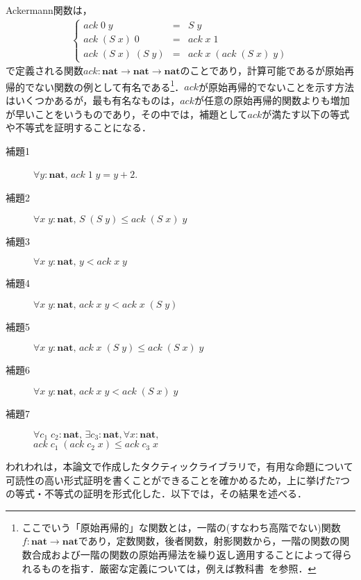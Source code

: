 \documentclass[submit]{ipsj}
\begin{document}
Ackermann関数は，
\begin{eqnarray}
\left\{\begin{array}{lll}
\mathit{ack}\;0\;y &=& S\;y \\
\mathit{ack}\;(S\;x)\;0 &=& \mathit{ack}\;x\;1 \\
\mathit{ack}\;(S\;x)\;(S\;y)&=& \mathit{ack}\;x\;(\mathit{ack}\;(S\;x)\;y)
\end{array}\right.\label{fml:ack}
\end{eqnarray}
で定義される関数$\mathit{ack} : \mathbf{nat} \to \mathbf{nat} \to \mathbf{nat}$のことであり，計算可能であるが原始再帰的でない関数の例として有名である\footnote{ここでいう「原始再帰的」な関数とは，一階の(すなわち高階でない)関数$f : \mathbf{nat} \to \mathbf{nat}$であり，定数関数，後者関数，射影関数から，一階の関数の関数合成および一階の関数の原始再帰法を繰り返し適用することによって得られるものを指す．厳密な定義については，例えば教科書~\cite{1986オートマトンと計算可能性}を参照．}．$\mathit{ack}$が原始再帰的でないことを示す方法はいくつかあるが，最も有名なものは，$\mathit{ack}$が任意の原始再帰的関数よりも増加が早いことをいうものであり，その中では，補題として$\mathit{ack}$が満たす以下の等式や不等式を証明することになる．
\begin{description}
\item[補題1]\label{lem1} $\forall y : \mathbf{nat},\, \mathit{ack}\;1\;y = y + 2$.
\item[補題2]\label{lem2} $\forall x \; y : \mathbf{nat},\,S\;(S\;y) \leq \mathit{ack}\;(S\;x)\;y$
\item[補題3]\label{lem3} $\forall x \; y : \mathbf{nat},\,y <\mathit{ack}\;x\;y$
\item[補題4]\label{lem4} $\forall x \; y : \mathbf{nat},\, \mathit{ack}\;x\;y < \mathit{ack}\;x\;(S\;y)$
\item[補題5]\label{lem5} $\forall x \; y : \mathbf{nat},\,\mathit{ack}\;x\;(S\;y) \leq \mathit{ack}\;(S\;x)\;y$
\item[補題6]\label{lem6} $\forall x \; y : \mathbf{nat},\, \mathit{ack}\;x\;y < \mathit{ack}\;(S\;x)\;y$
\item[補題7]\label{lem7} $\forall c_1 \; c_2 : \mathbf{nat},\, \exists c_3 : \mathbf{nat} \mathrel{,} \forall x : \mathbf{nat},$\\$\mathit{ack}\;c_1\;(\mathit{ack}\;c_2\;x) \leq \mathit{ack}\;c_3\;x$
\end{description}
われわれは，本論文で作成したタクティックライブラリで，有用な命題について可読性の高い形式証明を書くことができることを確かめるため，上に挙げた7つの等式・不等式の証明を形式化した．以下では，その結果を述べる．
\end{document}
